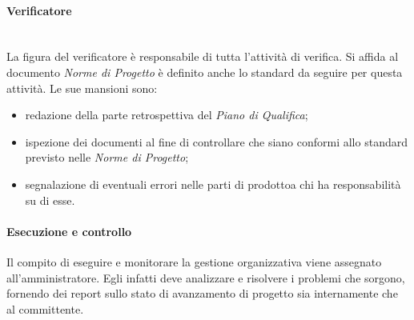 			\paragraph*{Verificatore}\mbox{}\\ [1mm]
				La figura del verificatore è responsabile di tutta l'attività di verifica.
				Si affida al documento \textit{Norme di Progetto} è definito anche lo standard da seguire per questa attività.
				Le sue mansioni sono:
				\begin{itemize}
					\item redazione della parte retrospettiva del \textit{Piano di Qualifica};
					\item ispezione dei documenti al fine di controllare che siano conformi allo standard previsto nelle \textit{Norme di Progetto};
					\item segnalazione di eventuali errori nelle parti di prodotto\glosp a chi ha responsabilità su di esse.
				\end{itemize}
		\paragraph{Esecuzione e controllo}
			Il compito di eseguire e monitorare la gestione organizzativa viene assegnato all'amministratore. Egli infatti deve analizzare e risolvere i problemi che sorgono, fornendo dei report sullo stato di avanzamento di progetto sia internamente che al committente.	
